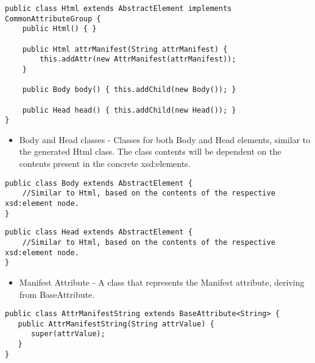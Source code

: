 \lstset{language=Java}

\begin{lstlisting}[caption={Html Element Class},captionpos=b]
public class Html extends AbstractElement implements CommonAttributeGroup {
    public Html() { }
    
    public Html attrManifest(String attrManifest) {
        this.addAttr(new AttrManifest(attrManifest));
    }
    
    public Body body() { this.addChild(new Body()); }
        
    public Head head() { this.addChild(new Head()); }
}
\end{lstlisting}

\begin{itemize}
	\item Body and Head classes - Classes for both Body and Head elements, similar to the generated Html class. The class contents will be dependent on the contents present in the concrete xsd:elements.
\end{itemize}

\bigskip

\begin{minipage}{\linewidth}
\begin{lstlisting}[caption={Body Element Class},captionpos=b]
public class Body extends AbstractElement {
	//Similar to Html, based on the contents of the respective xsd:element node.
}
\end{lstlisting}
\end{minipage}

\bigskip

\begin{minipage}{\linewidth}
\begin{lstlisting}[caption={Head Element Class},captionpos=b]
public class Head extends AbstractElement {
	//Similar to Html, based on the contents of the respective xsd:element node.
}
\end{lstlisting}
\end{minipage}

\begin{itemize}
	\item Manifest Attribute - A class that represents the Manifest attribute, deriving from BaseAttribute.
\end{itemize}

\bigskip

\begin{minipage}{\linewidth}
\begin{lstlisting}[caption={Manifest Attribute Class},captionpos=b]
public class AttrManifestString extends BaseAttribute<String> {
   public AttrManifestString(String attrValue) {
      super(attrValue);
   }
}
\end{lstlisting}
\end{minipage}

